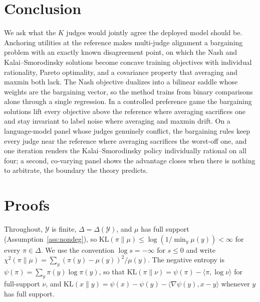 \documentclass[letterpaper]{article} %
\newcommand{\Y}{\mathcal{Y}}
\newcommand{\KL}{\mathrm{KL}}
\begin{document}
\section{Conclusion}
We ask what the $K$ judges would jointly agree the deployed model should be. Anchoring utilities at the reference makes multi-judge alignment a bargaining problem with an exactly known disagreement point, on which the Nash and Kalai--Smorodinsky solutions become concave training objectives with individual rationality, Pareto optimality, and a covariance property that averaging and maxmin both lack. The Nash objective dualizes into a bilinear saddle whose weights are the bargaining vector, so the method trains from binary comparisons alone through a single regression. In a controlled preference game the bargaining solutions lift every objective above the reference where averaging sacrifices one and stay invariant to label noise where averaging and maxmin drift. On a language-model panel whose judges genuinely conflict, the bargaining rules keep every judge near the reference where averaging sacrifices the worst-off one, and one iteration renders the Kalai--Smorodinsky policy individually rational on all four; a second, co-varying panel shows the advantage closes when there is nothing to arbitrate, the boundary the theory predicts.



\appendix
\section{Proofs}
Throughout, $\Y$ is finite, $\Delta=\Delta(\Y)$, and $\mu$ has full support (Assumption~\ref{ass:nondeg}), so $\KL(\pi\|\mu)\le\log(1/\min_y\mu(y))<\infty$ for every $\pi\in\Delta$. We use the convention $\log s=-\infty$ for $s\le0$ and write $\chi^2(\pi\|\mu)=\sum_y(\pi(y)-\mu(y))^2/\mu(y)$. The negative entropy is $\psi(\pi)=\sum_y\pi(y)\log\pi(y)$, so that $\KL(\pi\|\nu)=\psi(\pi)-\langle\pi,\log\nu\rangle$ for full-support $\nu$, and $\KL(x\|y)=\psi(x)-\psi(y)-\langle\nabla\psi(y),x-y\rangle$ whenever $y$ has full support.
\end{document}
